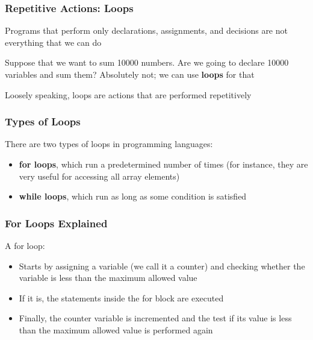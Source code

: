 \documentclass{beamer}
\begin{document}
\begin{frame}
\frametitle{Repetitive Actions: Loops}
    Programs that perform only declarations, assignments, and decisions are not everything that we can do
    \newline

    Suppose that we want to sum 10000 numbers. Are we going to declare 10000 variables and sum them? Absolutely not; we can use \textbf{loops} for that
    \newline

    Loosely speaking, loops are actions that are performed repetitively
\end{frame}

\begin{frame}
\frametitle{Types of Loops}
    There are two types of loops in programming languages:
    \begin{itemize}
        \item \textbf{for loops}, which run a predetermined number of times (for instance, they are very useful for accessing all array elements)
        
        \item \textbf{while loops}, which run as long as some condition is satisfied
        
    \end{itemize}
\end{frame}

\begin{frame}
\frametitle{For Loops Explained}
    A for loop:
    \begin{itemize}
        \item Starts by assigning a variable (we call it a counter) and checking whether the variable is less than the maximum allowed value
        \item If it is, the statements inside the for block are executed
        \item Finally, the counter variable is incremented and the test if its value is less than the maximum allowed value is performed again
    \end{itemize}
\end{frame}
\end{document}
